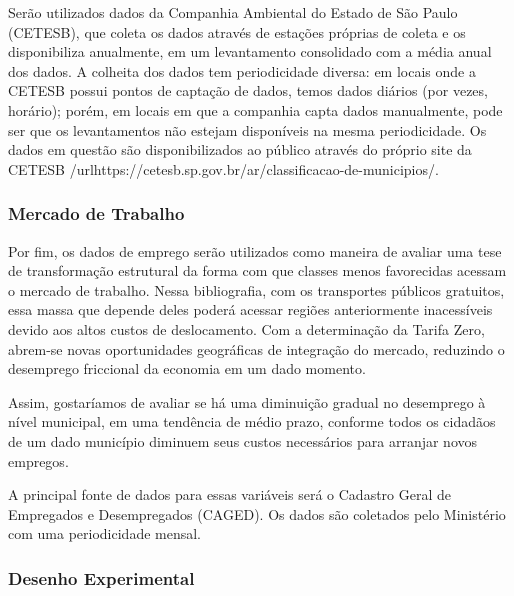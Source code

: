 Serão utilizados dados da Companhia Ambiental do Estado de São Paulo (CETESB), que coleta os dados através de estações próprias de coleta e os disponibiliza anualmente, em um levantamento consolidado com a média anual dos dados. A colheita dos dados tem periodicidade diversa: em locais onde a CETESB possui pontos de captação de dados, temos dados diários (por vezes, horário); porém, em locais em que a companhia capta dados manualmente, pode ser que os levantamentos não estejam disponíveis na mesma periodicidade. Os dados em questão são disponibilizados ao público através do próprio site da CETESB /url{https://cetesb.sp.gov.br/ar/classificacao-de-municipios/}.

\subsubsection{Mercado de Trabalho}
Por fim, os dados de emprego serão utilizados como maneira de avaliar uma tese de transformação estrutural da forma com que classes menos favorecidas acessam o mercado de trabalho. Nessa bibliografia, com os transportes públicos gratuitos, essa massa que depende deles poderá acessar regiões anteriormente inacessíveis devido aos altos custos de deslocamento. Com a determinação da Tarifa Zero, abrem-se novas oportunidades geográficas de integração do mercado, reduzindo o desemprego friccional da economia em um dado momento.

Assim, gostaríamos de avaliar se há uma diminuição gradual no desemprego à nível municipal, em uma tendência de médio prazo, conforme todos os cidadãos de um dado município diminuem seus custos necessários para arranjar novos empregos.

A principal fonte de dados para essas variáveis será o Cadastro Geral de Empregados e Desempregados (CAGED). Os dados são coletados pelo Ministério com uma periodicidade mensal.

\subsubsection{Desenho Experimental}


